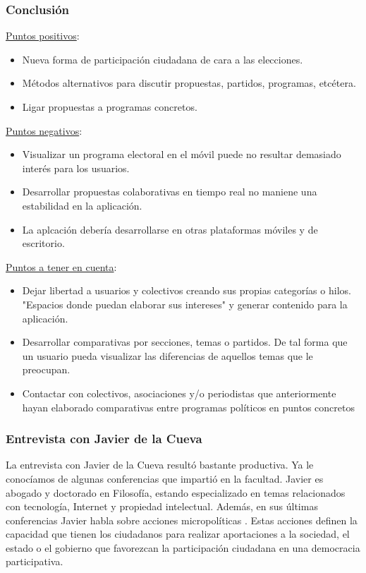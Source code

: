 \subsubsection{Conclusión}

\underline{Puntos positivos}:

\begin{itemize}
 \item Nueva forma de participación ciudadana de cara a las elecciones.
 \item Métodos alternativos para discutir propuestas, partidos, programas, etcétera.
 \item Ligar propuestas a programas concretos.
\end{itemize}

\underline{Puntos negativos}:

\begin{itemize}
 \item Visualizar un programa electoral en el móvil puede no resultar demasiado interés para los usuarios.
 \item Desarrollar propuestas colaborativas en tiempo real no maniene una estabilidad en la aplicación.
 \item La aplcación debería desarrollarse en otras plataformas móviles y de escritorio.
\end{itemize}

\underline{Puntos a tener en cuenta}:

\begin{itemize}
 \item Dejar libertad a usuarios y colectivos creando sus propias categorías o hilos. "Espacios donde puedan elaborar sus intereses" y generar contenido para la aplicación.
 \item Desarrollar comparativas por secciones, temas o partidos. De tal forma que un usuario pueda visualizar las diferencias de aquellos temas que le preocupan.
 \item Contactar con colectivos, asociaciones y/o periodistas que anteriormente hayan elaborado comparativas entre programas políticos en puntos concretos
\end{itemize}

\subsubsection{Entrevista con Javier de la Cueva}

La entrevista con Javier de la Cueva resultó bastante productiva. Ya le conocíamos de algunas conferencias que impartió en la facultad. Javier es abogado y doctorado en Filosofía, estando especializado en temas relacionados con tecnología, Internet y propiedad intelectual. Además, en sus últimas conferencias Javier habla sobre acciones micropolíticas \cite{ref:manualCiberactivista}. Estas acciones definen la capacidad que tienen los ciudadanos para realizar aportaciones a la sociedad, el estado o el gobierno que favorezcan la participación ciudadana en una democracia participativa.

